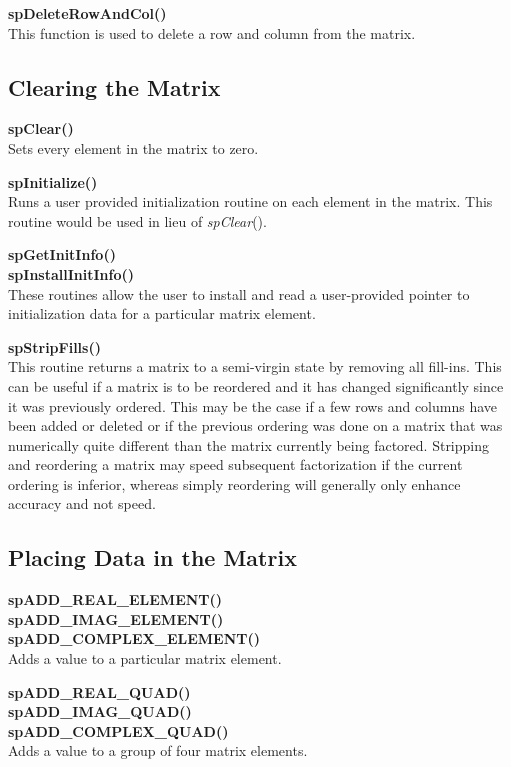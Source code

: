 \documentclass[11pt]{article}
\begin{document}
{\bf spDeleteRowAndCol()}\\
This function is used to delete a row and column from the matrix.

\subsection{Clearing the Matrix}

{\bf spClear()}\\
Sets every element in the matrix to zero.

{\bf spInitialize()}\\
Runs a user provided initialization routine on each element in the matrix.
This routine would be used in lieu of \emph{spClear}().

{\bf spGetInitInfo()}\\
{\bf spInstallInitInfo()}\\
These routines allow the user to install and read a user-provided pointer
to initialization data for a particular matrix element.

{\bf spStripFills()}\\
This routine returns a matrix to a semi-virgin state by removing all
fill-ins.  This can be useful if a matrix is to be reordered and it has
changed significantly since it was previously ordered.  This may be the
case if a few rows and columns have been added or deleted or if the
previous ordering was done on a matrix that was numerically quite
different than the matrix currently being factored.  Stripping and
reordering a matrix may speed subsequent factorization if the current
ordering is inferior, whereas simply reordering will generally only
enhance accuracy and not speed.

\subsection{Placing Data in the Matrix}

{\bf spADD\_REAL\_ELEMENT()}\\
{\bf spADD\_IMAG\_ELEMENT()}\\
{\bf spADD\_COMPLEX\_ELEMENT()}\\
Adds a value to a particular matrix element.

{\bf spADD\_REAL\_QUAD()}\\
{\bf spADD\_IMAG\_QUAD()}\\
{\bf spADD\_COMPLEX\_QUAD()}\\
Adds a value to a group of four matrix elements.
\end{document}
